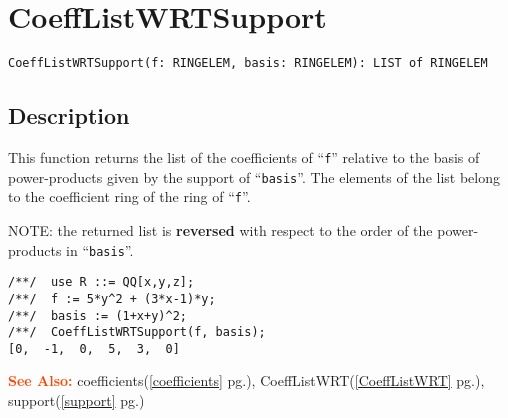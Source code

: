 \documentclass[a4paper]{mybook}
\newenvironment{command}{}{} %
\newcommand\SeeAlso{\par\textcolor{OrangeRed}{\textbf{\large See Also: }}}
\begin{document}
\section{CoeffListWRTSupport}
\label{CoeffListWRTSupport}
\begin{command} %


\begin{Verbatim}[label=syntax, rulecolor=\color{MidnightBlue},
frame=single]
CoeffListWRTSupport(f: RINGELEM, basis: RINGELEM): LIST of RINGELEM
\end{Verbatim}


\subsection*{Description}

This function returns the list of the coefficients of ``\verb&f&'' relative to
the basis of power-products given by the support of ``\verb&basis&''.  The
elements of the list belong to the coefficient ring of the ring of ``\verb&f&''.
\par 
NOTE: the returned list is \textbf{reversed} with respect to the order of
the power-products in ``\verb&basis&''.
\begin{Verbatim}[label=example, rulecolor=\color{PineGreen}, frame=single]
/**/  use R ::= QQ[x,y,z];
/**/  f := 5*y^2 + (3*x-1)*y;
/**/  basis := (1+x+y)^2;
/**/  CoeffListWRTSupport(f, basis);
[0,  -1,  0,  5,  3,  0]
\end{Verbatim}


\SeeAlso %
  coefficients(\ref{coefficients} pg.\pageref{coefficients}), 
    CoeffListWRT(\ref{CoeffListWRT} pg.\pageref{CoeffListWRT}), 
    support(\ref{support} pg.\pageref{support})
\end{command} %
\end{document}
